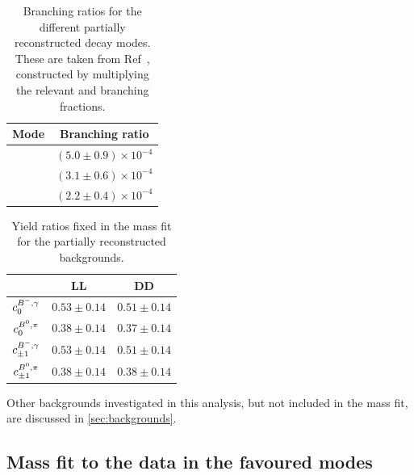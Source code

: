 \begin{table}[h]
\centering
\begin{tabular}{c|c}
Mode & Branching ratio \\
\hline
\decay{\Bm}{(\decay{\Dstarz}{\Dz\piz})\Kstarm} & $(5.0 \pm 0.9) \times 10^{-4}$ \\
\decay{\Bm}{(\decay{\Dstarz}{\Dz\gamma})\Kstarm} & $(3.1 \pm 0.6) \times 10^{-4}$ \\
\decay{\Bd}{(\decay{\Dstarp}{\Dz\pip})\Kstarm} & $(2.2 \pm 0.4) \times 10^{-4}$ \\
\end{tabular}
\caption{Branching ratios for the different partially reconstructed decay modes. These are taken from Ref~\cite{PDG2016}, constructed by multiplying the relevant \B and \Dstar branching fractions.}
\label{partrecoBRs}
\end{table}

\begin{table}[h]
\centering
\begin{tabular}{ccc}
\hline
& LL & DD \\
\hline
$c^{{{{B}^-}},\gamma}_0$ & $0.53 \pm 0.14$ & $0.51 \pm 0.14$ \\[3mm]
$c^{{{B}^0},\pi}_0$ & $0.38 \pm 0.14$ & $0.37 \pm 0.14$ \\[3mm]
$c^{{{{B}^-}},\gamma}_{\pm 1}$ & $0.53 \pm 0.14$ & $0.51 \pm 0.14$ \\[3mm]
$c^{{{B}^0},\pi}_{\pm 1}$ & $0.38 \pm 0.14$ & $0.38 \pm 0.14$ \\[3mm]
\hline
\end{tabular}
\caption{Yield ratios fixed in the mass fit for the partially reconstructed backgrounds.}
\label{fixedyieldratios}
\end{table}

Other backgrounds investigated in this analysis, but not included in the mass fit, are discussed in \sect\ref{sec:backgrounds}.


\subsection{Mass fit to the data in the favoured modes}
\label{sec:massfit:fit}

